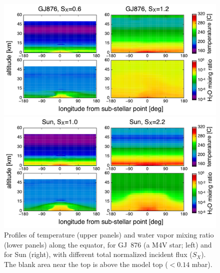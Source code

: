 \documentclass[11pt,numberedappendix,twocolappendix,]{emulateapj}
\def\wv{water vapor}
\begin{document}
\begin{figure}[t]
    \begin{minipage}{0.5\hsize}
\includegraphics[width=\hsize]{AqOH0TLS_GJ876_temp_xH2O.pdf}
    \end{minipage}
    \begin{minipage}{0.5\hsize}
\includegraphics[width=\hsize]{AqOH0TLS_Sun_temp_xH2O.pdf}
    \end{minipage}
    \caption{Profiles of temperature (upper panels) and \wv{} mixing ratio (lower panels) along the equator, for GJ~876 (a M4V star; left) and for Sun (right), with different total normalized incident flux ($S_X$). The blank area near the top is above the model top ($< 0.14$ mbar).}
\label{fig:3Dprofile_equator}
\end{figure}
\end{document}
